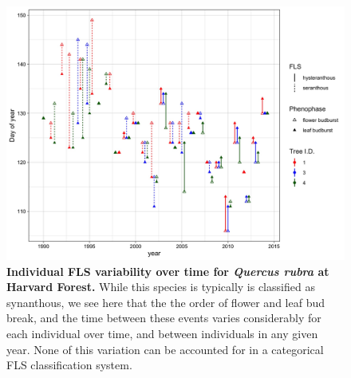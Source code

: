 \documentclass[12pt]{article}
\begin{document}
 \begin{figure}[ht]
        \centering
          \includegraphics[width=\textwidth]{..//figure/HF_Q_ru_interannual.jpeg}
        \caption{\textbf{Individual FLS variability over time for \textit{Quercus rubra} at Harvard Forest.} While this species is typically is classified as synanthous, we see here that the the order of flower and leaf bud break, and the time between these events varies considerably for each individual over time, and between individuals in any given year. None of this variation can be accounted for in a categorical FLS classification system.}
        \label{fig: Figure 3}
    \end{figure}
  
\end{document}

